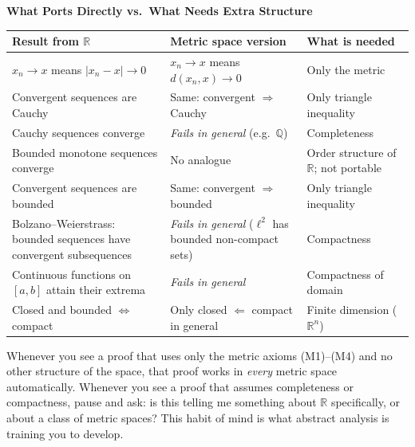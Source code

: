 \begin{center}
\small
\textbf{What Ports Directly vs.\ What Needs Extra Structure}
\smallskip

\begin{tabular}{p{5.2cm} p{4.4cm} p{4.4cm}}
\toprule
\textbf{Result from $\mathbb{R}$} & \textbf{Metric space version} & \textbf{What is needed} \\
\midrule
$x_n \to x$ means $|x_n - x| \to 0$ &
$x_n \to x$ means $d(x_n, x) \to 0$ &
Only the metric \\[6pt]

Convergent sequences are Cauchy &
Same: convergent $\Rightarrow$ Cauchy &
Only triangle inequality \\[6pt]

Cauchy sequences converge &
\emph{Fails in general} (e.g.\ $\mathbb{Q}$) &
Completeness \\[6pt]

Bounded monotone sequences converge &
No analogue &
Order structure of $\mathbb{R}$; not portable \\[6pt]

Convergent sequences are bounded &
Same: convergent $\Rightarrow$ bounded &
Only triangle inequality \\[6pt]

Bolzano--Weierstrass: bounded sequences have convergent subsequences &
\emph{Fails in general} ($\ell^2$ has bounded non-compact sets) &
Compactness \\[6pt]

Continuous functions on $[a,b]$ attain their extrema &
\emph{Fails in general} &
Compactness of domain \\[6pt]

Closed and bounded $\Leftrightarrow$ compact &
Only closed $\Leftarrow$ compact in general &
Finite dimension ($\mathbb{R}^n$) \\
\bottomrule
\end{tabular}
\end{center}

\begin{remark*}
Whenever you see a proof that uses only the metric axioms (M1)--(M4)
and no other structure of the space, that proof works in \emph{every}
metric space automatically.
Whenever you see a proof that assumes completeness or compactness,
pause and ask: is this telling me something about $\mathbb{R}$ specifically,
or about a class of metric spaces?
This habit of mind is what abstract analysis is training you to develop.
\end{remark*}

